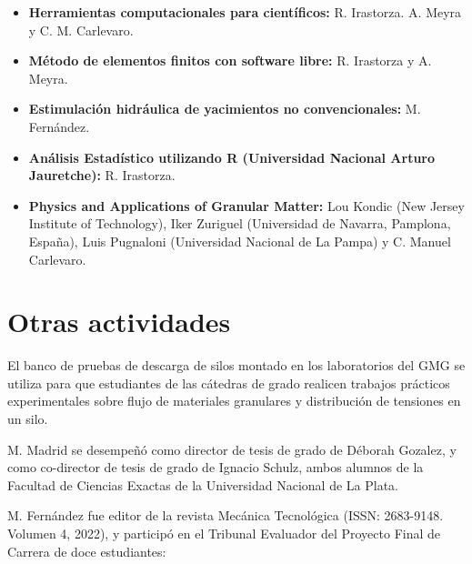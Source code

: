 \documentclass[a4paper,11pt,twoside,final,titlepage,onecolumn,openright]{report}
\begin{document}
\begin{itemize}
 \item {\bf Herramientas computacionales para científicos:} R. Irastorza. A. Meyra y C. M. Carlevaro.
 \item \textbf{Método de elementos finitos con software libre:} R. Irastorza y A. Meyra.
 \item \textbf{Estimulación hidráulica de yacimientos no convencionales:} M. Fernández.
 \item {\bf Análisis Estadístico utilizando R (Universidad Nacional Arturo Jauretche):} R. Irastorza.
 \item \textbf{Physics and Applications of Granular Matter:} Lou Kondic (New Jersey Institute of Technology), Iker Zuriguel (Universidad de Navarra, Pamplona, España), Luis Pugnaloni (Universidad Nacional de La Pampa) y C. Manuel Carlevaro.

\end{itemize}

\section{Otras actividades}

El banco de pruebas de descarga de silos montado en los laboratorios del GMG se utiliza para que estudiantes de las cátedras de grado realicen trabajos prácticos experimentales sobre flujo de materiales granulares y distribución de tensiones en un silo. 

M. Madrid se desempeñó como director de tesis de grado de Déborah Gozalez, y como co-director de tesis de grado de Ignacio Schulz, ambos alumnos de la Facultad de Ciencias Exactas de la Universidad Nacional de La Plata.

M. Fernández fue editor de la revista Mecánica Tecnológica (ISSN: 2683-9148. Volumen 4, 2022), y participó en el Tribunal Evaluador del Proyecto Final de Carrera de doce estudiantes:  
\end{document}
